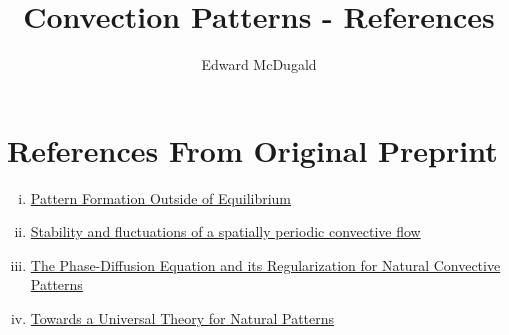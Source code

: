 \documentclass[12pt]{article}
\title{Convection Patterns - References}
\author{Edward McDugald}
\begin{document}
\maketitle

\section{References From Original Preprint}
\begin{enumerate}[(i)]
    \item \href{https://journals-aps-org.ezproxy3.library.arizona.edu/rmp/pdf/10.1103/RevModPhys.65.851}{Pattern Formation Outside of Equilibrium}
    \item \href{https://hal.archives-ouvertes.fr/jpa-00231699/file/ajp-jphyslet_1979_40_23_609_0.pdf}{Stability and fluctuations of a spatially periodic convective flow}
    \item \href{https://link-springer-com.ezproxy2.library.arizona.edu/content/pdf/10.1007/3-540-54899-8_29.pdf}{The Phase-Diffusion Equation and its Regularization for Natural Convective Patterns}
    \item \href{https://pdf.sciencedirectassets.com/271587/1-s2.0-S0167278900X02825/1-s2.0-0167278994901996/main.pdf?X-Amz-Security-Token=IQoJb3JpZ2luX2VjEMv%2F%2F%2F%2F%2F%2F%2F%2F%2F%2FwEaCXVzLWVhc3QtMSJHMEUCIFewl8lIqJuiTqChZzvh6zMZc8svolvdFNFHREdvqtxBAiEAvTWlyuBiTbOASmyVwWzTGOeNNE3gG%2B3HrfEEmeNXs3cq0gQIVBAFGgwwNTkwMDM1NDY4NjUiDCqdfRgkeRbURa6TISqvBCUMcsEGGPF8SANr%2BiK%2BUgDDqLu9P50aunmd793EBTbXm0eKmA%2B3GC%2B3faNn9FD40IHx4UFzeWTgJhVJjuILV9%2BlxNlaQv2EezB05HnNNYcTYrRC3R%2FZluqBGNECiQMcBZmPgPwEV9cVcsb44P71y0GqfAYDb%2F8698XYu7poFamSbf%2FbGqUnrIdF59pt9bIqy%2BTwRNhtxKz7Lf%2Bfq7KWdRolPEWPF6grin1yu5heXs7y8%2FHBTOtX0H3EO4GBp0t1QamLHsDxaUA5cRUyj3t8gGLRkcoOrRdNxT2EeTpr2RTKh5ipXhWZcH5My5oVUMIVqg%2BxWWgKxVixSq32Klmcbm2iz6So1fNQDnx0TGwLTpunR1o1C8EHh9AxINxGvq0Ccdfe8GolqGnsZiHm9JX%2Bx0KMBjupowq1Kxqojsz0Hqf59ovcNOVUB6RxBCzr0OitLfhWCiu7IHnsjPFjbcBwwjJk6y99xVSGBfvxZFRMfaYUMKQXzALFsHaNd%2FAYbBa73DVWZjb%2FGS8UCg0NOBQO13Pwf%2FcWp14zcabvgt5USC8QyNT52D8kjwWUUWuGERsaWGYPDUHrOsfAfRK%2FwAschqzNCmOaBpE5TDJgat10sDWKZ3E4V9RW3t0xunYeOJgNxHkMGV0W2u2%2B36J8i%2BqZRtsfYaXbVe4KTPAF9UKfoPSGLuRtNQ1FOpLut9C93ouk37cYaGvoRRG17nsO4iVoVnugwOKx%2BoM5j%2FbgYpQ1I3IwwpK7mAY6qQFQUAjbZjrkj%2FtxAC3r0Plf5fstjRDUFSc8mk9TQWnq7Uer%2FNofL8AqoqicIbYYjdb3IIfgu1vPbHCOF5%2BqAUmpKGW7Z%2BGDJVYfpuRqvmpIK0ZOVWKZqS%2Bk7VyAtroE3FE7GmGiBjqmhb67RZ17JIbgbO1dbSqlaM0RZVdMqGcnl1EZ%2BScZGPN6UIaxWwqHMUxB9ayOK%2FEXL6v1vtqIfXOcLDyUZ6RL%2F4WT&X-Amz-Algorithm=AWS4-HMAC-SHA256&X-Amz-Date=20220831T035615Z&X-Amz-SignedHeaders=host&X-Amz-Expires=300&X-Amz-Credential=ASIAQ3PHCVTYWNZHTNEE%2F20220831%2Fus-east-1%2Fs3%2Faws4_request&X-Amz-Signature=b29481f485bd46faff05fc17c6726355c75f67a00df24f648e7dde60e533c180&hash=7af029b8b5119e8c04f858a2e16dbcb3a3837255088ba43b2b70c295617074d4&host=68042c943591013ac2b2430a89b270f6af2c76d8dfd086a07176afe7c76c2c61&pii=0167278994901996&tid=spdf-44ba6d3a-220c-4c21-955b-4853797e7514&sid=f4108f064053494679698ac9f79c6b821331gxrqa&type=client&ua=4d54575502550a56575a&rr=7432d5d449e9a6ee}{Towards a Universal Theory for Natural Patterns}

\end{enumerate}
\end{document}
